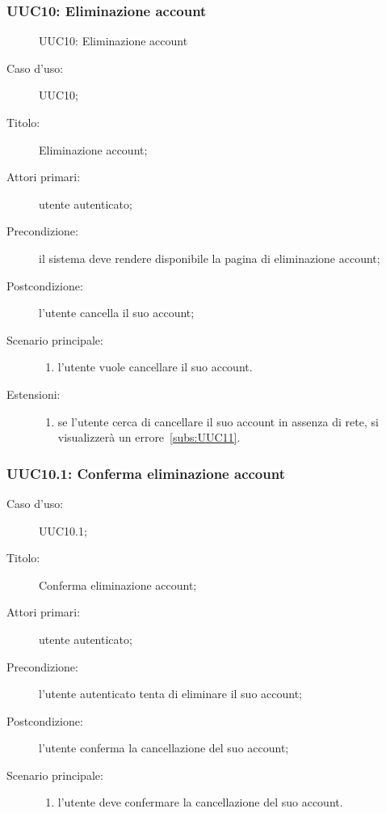 \documentclass[../../../analisi-dei-requisiti.tex]{subfiles}
\begin{document}
\subsubsection{UUC10: Eliminazione account}%
\label{subs:UUC10}

\begin{figure}[H]
  \centering
  \caption{UUC10: Eliminazione account}%
  \label{fig:UUC10}
\end{figure}

\begin{description}
  \item[Caso d'uso:] UUC10;
  \item[Titolo:] Eliminazione account;
  \item[Attori primari:] utente autenticato;
  \item[Precondizione:] il sistema deve rendere disponibile la pagina di eliminazione account;
  \item[Postcondizione:] l'utente cancella il suo account;
  \item[Scenario principale:]
        \begin{enumerate}
          \item l'utente vuole cancellare il suo account.
        \end{enumerate}
  \item[Estensioni:]
        \begin{enumerate}
          \item se l'utente cerca di cancellare il suo account in assenza di rete, si visualizzerà un errore~\ref{subs:UUC11}.
        \end{enumerate}
\end{description}

\subsubsection{UUC10.1: Conferma eliminazione account}%
\label{subs:UUC10.1}

\begin{description}
  \item[Caso d'uso:] UUC10.1;
  \item[Titolo:] Conferma eliminazione account;
  \item[Attori primari:] utente autenticato;
  \item[Precondizione:] l'utente autenticato tenta di eliminare il suo account;
  \item[Postcondizione:] l'utente conferma la cancellazione del suo account;
  \item[Scenario principale:]
        \begin{enumerate}
          \item l'utente deve confermare la cancellazione del suo account.
        \end{enumerate}
\end{description}
\end{document}
